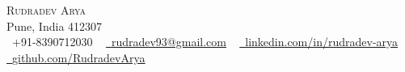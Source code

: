 \documentclass[letterpaper,11pt]{article}
\begin{document}

\begin{center}
    {\Huge \scshape Rudradev Arya} \\ \vspace{1pt}
    Pune, India 412307 \\ \vspace{1pt}
    \small \raisebox{-0.1\height}\faPhone\ +91-8390712030 ~ \href{mailto:x@gmail.com}{\raisebox{-0.2\height}\faEnvelope\  \underline{rudradev93@gmail.com}} ~ 
    \href{https://linkedin.com/in//}{\raisebox{-0.2\height}\faLinkedin\ \underline{linkedin.com/in/rudradev-arya}}  ~
    \href{https://github.com/}{\raisebox{-0.2\height}\faGithub\ \underline{github.com/RudradevArya}}
    \vspace{-8pt}
\end{center}
\end{document}
